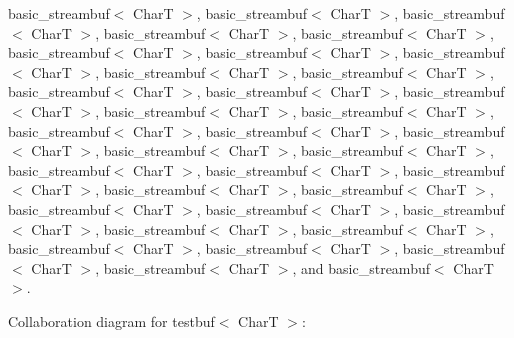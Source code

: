 basic\+\_\+streambuf$<$ Char\+T $>$, basic\+\_\+streambuf$<$ Char\+T $>$, basic\+\_\+streambuf$<$ Char\+T $>$, basic\+\_\+streambuf$<$ Char\+T $>$, basic\+\_\+streambuf$<$ Char\+T $>$, basic\+\_\+streambuf$<$ Char\+T $>$, basic\+\_\+streambuf$<$ Char\+T $>$, basic\+\_\+streambuf$<$ Char\+T $>$, basic\+\_\+streambuf$<$ Char\+T $>$, basic\+\_\+streambuf$<$ Char\+T $>$, basic\+\_\+streambuf$<$ Char\+T $>$, basic\+\_\+streambuf$<$ Char\+T $>$, basic\+\_\+streambuf$<$ Char\+T $>$, basic\+\_\+streambuf$<$ Char\+T $>$, basic\+\_\+streambuf$<$ Char\+T $>$, basic\+\_\+streambuf$<$ Char\+T $>$, basic\+\_\+streambuf$<$ Char\+T $>$, basic\+\_\+streambuf$<$ Char\+T $>$, basic\+\_\+streambuf$<$ Char\+T $>$, basic\+\_\+streambuf$<$ Char\+T $>$, basic\+\_\+streambuf$<$ Char\+T $>$, basic\+\_\+streambuf$<$ Char\+T $>$, basic\+\_\+streambuf$<$ Char\+T $>$, basic\+\_\+streambuf$<$ Char\+T $>$, basic\+\_\+streambuf$<$ Char\+T $>$, basic\+\_\+streambuf$<$ Char\+T $>$, basic\+\_\+streambuf$<$ Char\+T $>$, basic\+\_\+streambuf$<$ Char\+T $>$, basic\+\_\+streambuf$<$ Char\+T $>$, basic\+\_\+streambuf$<$ Char\+T $>$, basic\+\_\+streambuf$<$ Char\+T $>$, basic\+\_\+streambuf$<$ Char\+T $>$, basic\+\_\+streambuf$<$ Char\+T $>$, basic\+\_\+streambuf$<$ Char\+T $>$, and basic\+\_\+streambuf$<$ Char\+T $>$.



Collaboration diagram for testbuf$<$ CharT $>$\+:
